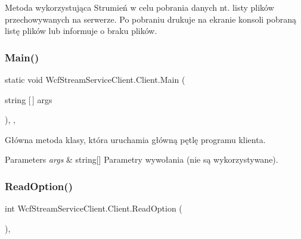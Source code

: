 Metoda wykorzystująca Strumień w celu pobrania danych nt. listy plików przechowywanych na serwerze. Po pobraniu drukuje na ekranie konsoli pobraną listę plików lub informuje o braku plików. 

\mbox{\label{class_wcf_stream_service_client_1_1_client_a6d53a06adb60957a2c84413f13d54b4f}} 
\subsubsection{\texorpdfstring{Main()}{Main()}}
{\footnotesize\ttfamily static void Wcf\+Stream\+Service\+Client.\+Client.\+Main (\begin{DoxyParamCaption}\item[{string \mbox{[}$\,$\mbox{]}}]{args }\end{DoxyParamCaption})\hspace{0.3cm}{\ttfamily [inline]}, {\ttfamily [static]}, {\ttfamily [private]}}



Główna metoda klasy, która uruchamia główną pętlę programu klienta. 


\begin{DoxyParams}{Parameters}
{\em args} & string\mbox{[}\mbox{]} Parametry wywołania (nie są wykorzystywane).\\
\hline
\end{DoxyParams}
\mbox{\label{class_wcf_stream_service_client_1_1_client_a2e7604484e1dc3f97b475c6849be1e38}} 
\subsubsection{\texorpdfstring{Read\+Option()}{ReadOption()}}
{\footnotesize\ttfamily int Wcf\+Stream\+Service\+Client.\+Client.\+Read\+Option (\begin{DoxyParamCaption}{ }\end{DoxyParamCaption})\hspace{0.3cm}{\ttfamily [inline]}, {\ttfamily [private]}}



